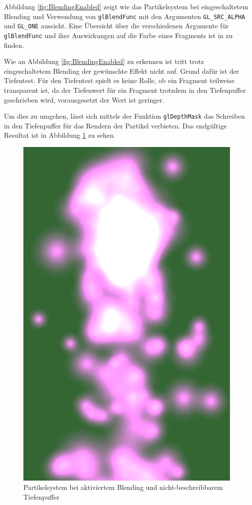 Abbildung \ref{fig:BlendingEnabled} zeigt wie das Partikelsystem bei eingeschaltetem Blending und Verwendung von {\texttt{glBlendFunc}} mit den Argumenten {\texttt{GL\_SRC\_ALPHA}} und {\texttt{GL\_ONE}} aussieht. Eine Übersicht über die verschiedenen Argumente für {\texttt{glBlendFunc}} und ihre Auswirkungen auf die Farbe eines Fragments ist in \cite{virag:2012} zu finden.

Wie an Abbildung \ref{fig:BlendingEnabled} zu erkennen ist tritt trotz eingeschaltetem Blending der gewünschte Effekt nicht auf. Grund dafür ist der Tiefentest. Für den Tiefentest spielt es keine Rolle, ob ein Fragment teilweise transparent ist, da der Tiefenwert für ein Fragment trotzdem in den Tiefenpuffer geschrieben wird, vorausgesetzt der Wert ist geringer.

Um dies zu umgehen, lässt sich mittels der Funktion {\texttt{glDepthMask}} das Schreiben in den Tiefenpuffer für das Rendern der Partikel verbieten.
Das endgültige Resultat ist in Abbildung \ref{fig:ParticleFinal} zu sehen.

\begin{figure}[h]
	\centering
	\includegraphics[scale=0.4]{bilder/ParticleFinal}
	\caption{Partikelsystem bei aktiviertem Blending und nicht-beschreibbarem Tiefenpuffer}
	\label{fig:ParticleFinal}
\end{figure}
%


